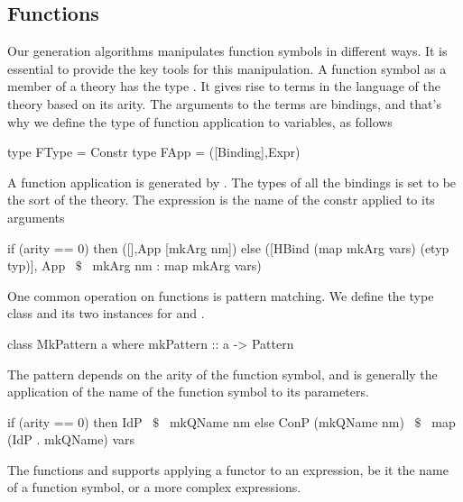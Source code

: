 \subsection{Functions}
\label{subsec:generation:functions}
Our generation algorithms manipulates function symbols in different ways. It is essential to provide the key tools for this manipulation. A function symbol as a member of a theory has the type . It gives rise to terms in the language of the theory based on its arity. The arguments to the terms are bindings, and that's why we define the type  of function application to variables, as follows 
\begin{hscode}
type FType = Constr
type FApp = ([Binding],Expr)
\end{hscode}
A function application is generated by . The types of all the bindings is set to be the sort of the theory. The expression is the name of the constr applied to its arguments 
\begin{hscode} 
 if (arity == 0) then ([],App [mkArg nm])
 else ([HBind (map mkArg vars) (etyp typ)],
            App ~$\$$~ mkArg nm : map mkArg vars)   
\end{hscode} 

One common operation on functions is pattern matching. We define the type class  and its two instances for  and . 
\begin{hscode}
class MkPattern a where
  mkPattern :: a -> Pattern
\end{hscode} 
The pattern depends on the arity of the function symbol, and is generally the application of the name of the function symbol to its parameters. 
\begin{hscode} 
 if (arity == 0)
 then IdP ~$\$$~ mkQName nm 
 else ConP (mkQName nm) ~$\$$~ map (IdP . mkQName) vars 
\end{hscode} 

The functions  and  supports applying a functor to an expression, be it the name of a function symbol, or a more complex expressions.

